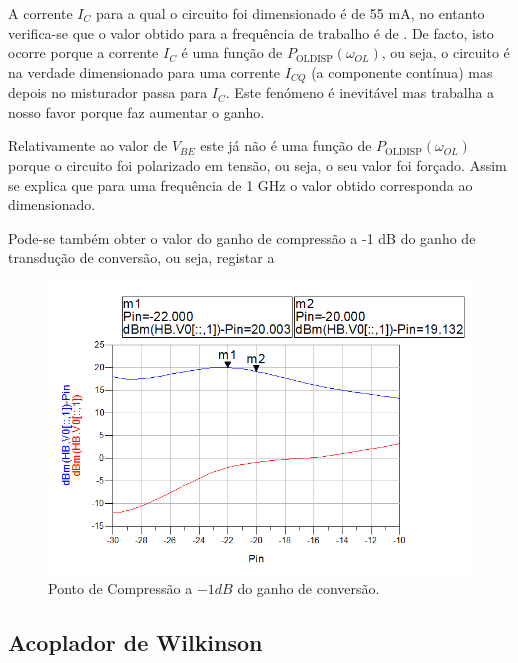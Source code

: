 \documentclass[11pt]{article}
\numberwithin{equation}{section}
\begin{document}
A corrente $I_{C}$ para a qual o circuito foi dimensionado é de 55 mA, no entanto verifica-se que o valor obtido para a frequência de trabalho é de . De facto, isto ocorre porque a corrente $I_{C}$ é uma função de $ P_{\text{OLDISP}}\left(\omega_{OL}\right) $, ou seja, o circuito é na verdade dimensionado para uma corrente $I_{CQ}$ (a componente contínua) mas depois no misturador passa para $I_{C}$. Este fenómeno é inevitável mas trabalha a nosso favor porque faz aumentar o ganho.

Relativamente ao valor de $V_{BE}$ este já não é uma função de $ P_{\text{OLDISP}}\left(\omega_{OL}\right) $ porque o circuito foi polarizado em tensão, ou seja, o seu valor foi forçado. Assim se explica que para uma frequência de 1 GHz o valor obtido corresponda ao dimensionado.


Pode-se também obter o valor do ganho de compressão a -1 dB do ganho de transdução de conversão, ou seja, registar a 

\begin{figure}[h]
\centering
\includegraphics[keepaspectratio=true, scale=0.45]{exps/Compression}
\vspace{-0.5em}
\caption{Ponto de Compressão a $-1dB$ do ganho de conversão.}
\vspace{-0.8em}
\label{fig:Compressao}
\end{figure}



\subsection{Acoplador de Wilkinson}
\end{document}
